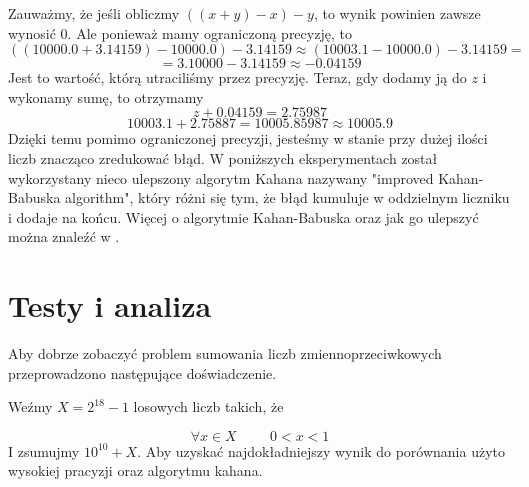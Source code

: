 \documentclass[11pt, wide]{article}
\begin{document}
    Zauważmy, że jeśli obliczmy $((x + y) - x) - y$, to wynik powinien zawsze wynosić $0$. Ale ponieważ mamy ograniczoną
    precyzję, to 
    $$
    ((10000.0 + 3.14159) - 10000.0) - 3.14159 \approx (10003.1 - 10000.0) - 3.14159 =
    $$
    $$
    = 3.10000 - 3.14159 \approx -0.04159
    $$
    Jest to wartość, którą utraciliśmy przez precyzję. Teraz, gdy dodamy ją do $z$ i wykonamy sumę, to otrzymamy
    $$
    z + 0.04159 = 2.75987 
    $$
    $$
    10003.1 + 2.75887 = 10005.85987 \approx 10005.9
    $$
    Dzięki temu pomimo ograniczonej precyzji, jesteśmy w stanie przy dużej ilości liczb znacząco zredukować błąd.
    W poniższych eksperymentach został wykorzystany nieco ulepszony algorytm Kahana nazywany "improved Kahan-Babuska algorithm", który różni się tym, że błąd kumuluje w oddzielnym liczniku i dodaje na końcu.
    Więcej o algorytmie Kahan-Babuska oraz jak go ulepszyć można znaleźć w \cite{KH}.
    \section{Testy i analiza}\label{Testy}
    Aby dobrze zobaczyć problem sumowania liczb zmiennoprzeciwkowych przeprowadzono następujące doświadczenie.
    \\
\begin{center}Weźmy $X = 2^{18} -1$ losowych liczb takich, że\end{center}
     $$\forall{x} \in X \hspace{1cm} 0 < x < 1$$
    I zsumujmy $10^{10} + X$. Aby uzyskać najdokładniejszy wynik do porównania użyto wysokiej pracyzji oraz
    algorytmu kahana.
    \\
    
\end{document}
